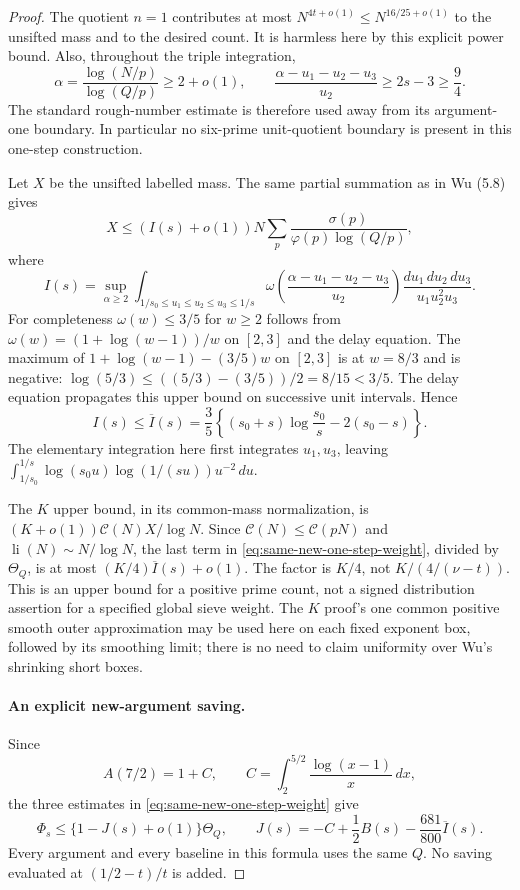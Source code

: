 \documentclass[11pt]{article}
\begin{document}
\begin{proof}
The quotient $n=1$ contributes at most $N^{4t+o(1)}\le N^{16/25+o(1)}$
to the unsifted mass and to the desired count. It is harmless here
by this explicit power bound. Also, throughout the triple integration,
\[
 \alpha=\frac{\log(N/p)}{\log(Q/p)}\ge2+o(1),\qquad
 \frac{\alpha-u_1-u_2-u_3}{u_2}\ge2s-3\ge\frac94.
\]
The standard rough-number estimate is therefore used away from its
argument-one boundary. In particular no six-prime unit-quotient
boundary is present in this one-step construction.

Let $X$ be the unsifted labelled mass. The same partial summation as
in Wu (5.8) gives
\[
 X\le (I(s)+o(1))N
       \sum_p\frac{\sigma(p)}{\varphi(p)\log(Q/p)},
\]
where
\[
 I(s)=\sup_{\alpha\ge2}
 \int_{1/s_0\le u_1\le u_2\le u_3\le1/s}
 \omega\!\left(\frac{\alpha-u_1-u_2-u_3}{u_2}\right)
 \frac{du_1\,du_2\,du_3}{u_1u_2^2u_3}.
\]
For completeness $\omega(w)\le3/5$ for $w\ge2$ follows from
$\omega(w)=(1+\log(w-1))/w$ on $[2,3]$ and the delay equation.
The maximum of
$1+\log(w-1)-(3/5)w$ on $[2,3]$ is at $w=8/3$ and is negative:
$\log(5/3)\le((5/3)-(3/5))/2=8/15<3/5$.
The delay equation propagates this upper bound on successive unit
intervals. Hence
\begin{equation}\label{eq:same-new-one-step-Ibar}
 I(s)\le\overline I(s)=\frac35
 \left\{(s_0+s)\log\frac{s_0}{s}-2(s_0-s)\right\}.
\end{equation}
The elementary integration here first integrates $u_1,u_3$, leaving
$\int_{1/s_0}^{1/s}\log(s_0u)\log(1/(su))u^{-2}\,du$.

The $K$ upper bound, in its common-mass normalization, is
$(K+o(1))\mathcal C(N)X/\log N$. Since
$\mathcal C(N)\le\mathcal C(pN)$ and $\operatorname{li}(N)\sim N/\log N$,
the last term in \eqref{eq:same-new-one-step-weight}, divided by
$\Theta_Q$, is at most $(K/4)\overline I(s)+o(1)$.
The factor is $K/4$, not $K/(4/(\nu-t))$.
This is an upper bound for a positive prime count, not a signed
distribution assertion for a specified global sieve weight.
The $K$ proof's one common positive smooth outer approximation may be
used here on each fixed exponent box, followed by its smoothing limit;
there is no need to claim uniformity over Wu's shrinking short boxes.

\paragraph{An explicit new-argument saving.}
Since
\[
 A(7/2)=1+C,\qquad
 C=\int_2^{5/2}\frac{\log(x-1)}x\,dx,
\]
the three estimates in \eqref{eq:same-new-one-step-weight} give
\begin{equation}\label{eq:same-new-one-step-J}
 \Phi_s\le\{1-J(s)+o(1)\}\Theta_Q,\qquad
 J(s)=-C+\frac12B(s)-\frac{681}{800}\overline I(s).
\end{equation}
Every argument and every baseline in this formula uses the same $Q$.
No saving evaluated at $(1/2-t)/t$ is added.


\end{proof}
\end{document}
